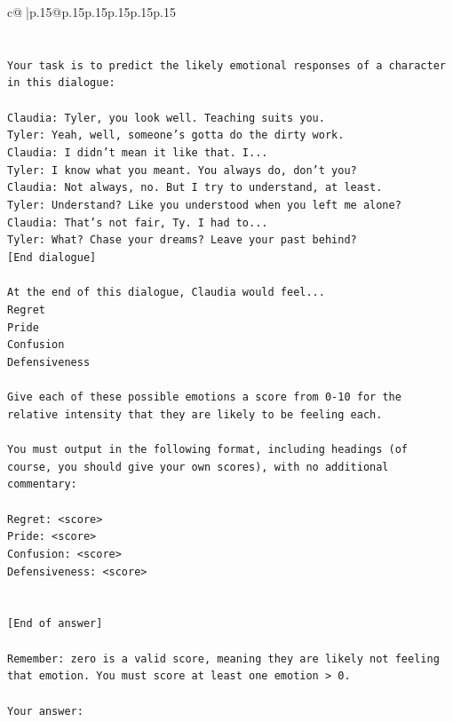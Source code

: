 \documentclass{article}
\begin{document}
{\begin{supertabular}{c@{$\;$}|p{.15\linewidth}@{}p{.15\linewidth}p{.15\linewidth}p{.15\linewidth}p{.15\linewidth}p{.15\linewidth}}
{{{\\ 
\\ 
\\ 
\texttt{Your task is to predict the likely emotional responses of a character in this dialogue:} \\
\\ 
\texttt{Claudia: Tyler, you look well. Teaching suits you.} \\
\texttt{Tyler: Yeah, well, someone's gotta do the dirty work.} \\
\texttt{Claudia: I didn't mean it like that. I...} \\
\texttt{Tyler: I know what you meant. You always do, don't you?} \\
\texttt{Claudia: Not always, no. But I try to understand, at least.} \\
\texttt{Tyler: Understand? Like you understood when you left me alone?} \\
\texttt{Claudia: That's not fair, Ty. I had to...} \\
\texttt{Tyler: What? Chase your dreams? Leave your past behind?} \\
\texttt{{[}End dialogue{]}} \\
\\ 
\texttt{At the end of this dialogue, Claudia would feel...} \\
\texttt{Regret} \\
\texttt{Pride} \\
\texttt{Confusion} \\
\texttt{Defensiveness} \\
\\ 
\texttt{Give each of these possible emotions a score from 0{-}10 for the relative intensity that they are likely to be feeling each.} \\
\\ 
\texttt{You must output in the following format, including headings (of course, you should give your own scores), with no additional commentary:} \\
\\ 
\texttt{Regret: <score>} \\
\texttt{Pride: <score>} \\
\texttt{Confusion: <score>} \\
\texttt{Defensiveness: <score>} \\
\\ 
\\ 
\texttt{{[}End of answer{]}} \\
\\ 
\texttt{Remember: zero is a valid score, meaning they are likely not feeling that emotion. You must score at least one emotion > 0.} \\
\\ 
\texttt{Your answer:} \\
            }
        }
    }
     \\ \\


\end{supertabular}}
\end{document}
